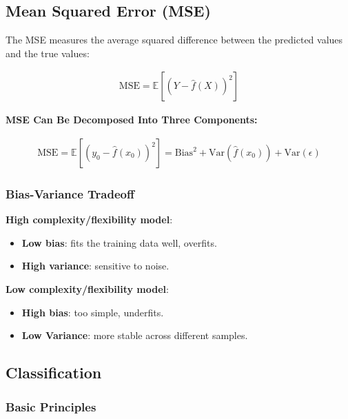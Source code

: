 \subsection{Mean Squared Error (MSE)}

\indent 

The MSE measures the average squared difference between the predicted values and the true values:

\begin{align*}
    \text{MSE} = \mathbb{E}[(Y-\hat{f}(X))^2]
\end{align*}

\textbf{MSE Can Be Decomposed Into Three Components:}

\begin{align*}
    \text{MSE} = \mathbb{E}[(y_0-\hat{f}(x_0))^2] = \text{Bias}^2+\text{Var}(\hat{f}(x_0))+\text{Var}(\epsilon)
\end{align*}

\subsubsection{Bias-Variance Tradeoff}

\indent

\noindent \textbf{High complexity/flexibility model}: 

\begin{itemize}
    \item \textbf{Low bias}: fits the training data well, overfits.
    \item \textbf{High variance}: sensitive to noise.
\end{itemize}

\noindent\textbf{Low complexity/flexibility model}:

\begin{itemize}
    \item \textbf{High bias}: too simple, underfits.
    \item \textbf{Low Variance}: more stable across different samples.
\end{itemize}

\subsection{Classification}

\subsubsection{Basic Principles}

